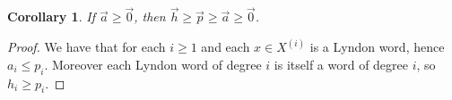 \documentclass[11pt]{amsart}
\newcommand{\defncolor}{\color{darkred}}
\newcommand{\defn}[1]{{\defncolor\emph{#1}}} %
\newtheorem{corollary}[theorem]{Corollary}
\theoremstyle{definition}
\numberwithin{equation}{section}
\newcommand{\mike}[1]{\todo[size=\tiny,color=green!30]{#1 \\ \hfill --- Mike}}
\begin{document}
\begin{corollary}
If $\vec{a} \geq \vec{0}$, then $\vec{h} \geq \vec{p} \geq \vec{a} \geq \vec{0}$.
\end{corollary}
\begin{proof}
We have that for each $i \geq 1$ and each $x \in X^{(i)}$ is a Lyndon word, hence $a_i \leq p_i$.
Moreover each Lyndon word of degree $i$ is itself a word of degree $i$, so $h_i \geq p_i$.
\end{proof}

\begin{comment}
A \defn{set partition} $A$ of a finite set $X$ is a set of sets $A = \{ A_1, A_2, \ldots, A_k \}$ where $A_i \subseteq X$,
$A_i \cap A_j = \emptyset$ if $i \neq j$ and $\cup_{i=1}^k A_i = X$.  The sets $A_i$ are known as the \defn{parts}
of the set partition.  We indicate that $A$ is a set partition of
$[n] := \{1,2, \ldots, n\}$ by the notation $A \vdash [n]$ and the \defn{length} of the
set partition $A$ is $k$ and is denoted $\ell(A)$.

A set partition $A$ is called \defn{crossing} if there exists $A_i \neq A_j$ which
are parts of $A$ with $a < b < c < d$ and $a,c \in A_i$ and $b,d \in A_j$.  A set partition is said to be \defn{noncrossing} otherwise.
A set partition $A$ is said to be \defn{nesting} if there exists $A_i \neq A_j$ which
are parts of $A$ with $a < b < c < d$ and $a,d \in A_i$ and $b,c \in A_j$ and is \defn{nonnesting} otherwise.
\mike{The definition of non-nesting is probably not correct}

We will define a few combinatorial operations on set partitions that we will need to describe the algebra structure.
For $A \vdash [n]$ and $k \in \mathbb{Z}_{\geq 0}$, let $A_{\uparrow k}$ be the set partition
$\{ \{ a + k : a \in A_i \} : 1 \leq i \leq \ell(A) \}$.  If $A \vdash [n]$ is not equal to $B \cup C_{\uparrow k}$
for some set partitions $B \vdash [k]$ and $C \vdash [n-k]$ with $0 < k < n$, then we say that
$A$ is \defn{atomic}.

The algebra of symmetric functions in noncommuting variables was first considered by Wolf \cite{W36}
and much later in a more combinatorial setting by Rosas and Sagan \cite{RS06}.
We will define $\mathsf{NCSym}$ by its Hopf algebra structure as the linear span of set partitions.
We define the finite dimensional vector space
$\mathsf{NCSym}_n = \mathrm{span}_{\mathbb C}\{ \mathbf{h}_A : A \vdash [n] \}$
and set $\mathsf{NCSym} := \bigoplus_{n \geq 0} \mathsf{NCSym}_n$.

The product on $\mathsf{NCSym}$ is defined on the basis elements and extended linearly.
Let $A \vdash [k]$ and $B \vdash [n]$, then
$$\mathbf{h}_A \cdot \mathbf{h}_B = \mathbf{h}_{A \cup B_{\uparrow k}}~.$$

The coproduct on the Hopf algebra $\mathsf{NCSym}$ appears in \cite{B08}
and is equal to
$$\Delta(\mathbf{h}_A) = \sum_{A \subseteq [n]}
\mathbf{h}_{\mathrm{st}(A|_S)} \otimes \mathbf{h}_{\mathrm{st}(A|_{S^c})}~.$$
\mike{notation to be defined above: $A|_S$, $\mathrm{st}(A)$}
\end{comment}
\end{document}
